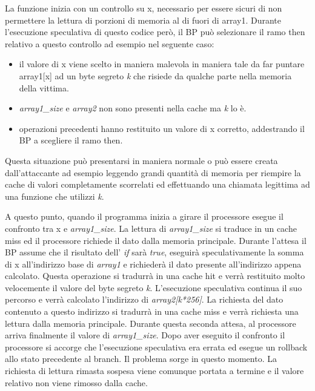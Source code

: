 			La funzione inizia con un controllo su x, necessario per essere sicuri di non permettere la lettura di porzioni di memoria al di fuori di array1. Durante l'esecuzione speculativa di questo codice però, il \ac{BP} può selezionare il ramo then relativo a questo controllo ad esempio nel seguente caso:
			
			\begin{itemize}
				\item il valore di x viene scelto in maniera malevola in maniera tale da far puntare array1[x] ad un byte segreto \emph{k} che risiede da qualche parte nella memoria della vittima.
				\item \emph{array1\_size} e \emph{array2} non sono presenti nella cache ma \emph{k} lo è.
				\item operazioni precedenti hanno restituito un valore di x corretto, addestrando il \ac{BP} a scegliere il ramo then.
			\end{itemize}
		
			Questa situazione può presentarsi in maniera normale o può essere creata dall'attaccante ad esempio leggendo grandi quantità di memoria per riempire la cache di valori completamente scorrelati ed effettuando una chiamata legittima ad una funzione che utilizzi \emph{k}.
			
			A questo punto, quando il programma inizia a girare il processore esegue il confronto tra x e \emph{array1\_size}. La lettura di \emph{array1\_size} si traduce in un cache miss ed il processore richiede il dato dalla memoria principale. Durante l'attesa il \ac{BP} assume che il risultato dell' \emph{if} sarà \emph{true}, eseguirà speculativamente la somma di x all'indirizzo base di \emph{array1} e richiederà il dato presente all'indirizzo appena calcolato. Questa operazione si tradurrà in una cache hit e verrà restituito molto velocemente il valore del byte segreto \emph{k}. L'esecuzione speculativa continua il suo percorso e verrà calcolato l'indirizzo di \emph{array2[k*256]}. La richiesta del dato contenuto a questo indirizzo si tradurrà in una cache miss e verrà richiesta una lettura dalla memoria principale. Durante questa seconda attesa, al processore arriva finalmente il valore di \emph{array1\_size}. Dopo aver eseguito il confronto il processore si accorge che l'esecuzione speculativa era errata ed esegue un rollback allo stato precedente al branch. Il problema sorge in questo momento. La richiesta di lettura rimasta sospesa viene comunque portata a termine e il valore relativo non viene rimosso dalla cache.
			
